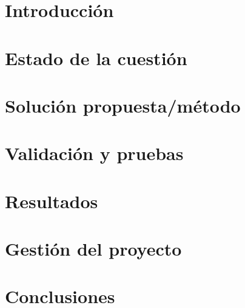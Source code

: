 \documentclass[12pt]{report} %
\begin{document}
\listoffigures
\thispagestyle{fancy}

\newpage %
\thispagestyle{empty}
\mbox{}

\listoftables
\thispagestyle{fancy}

\newpage %
\thispagestyle{empty}
\mbox{}


\clearpage
{} %

\chapter{Introducción}

\chapter{Estado de la cuestión}

\chapter{Solución propuesta/método}

\chapter{Validación y pruebas}

\chapter{Resultados}

\chapter{Gestión del proyecto}

\chapter{Conclusiones}

\end{document}
